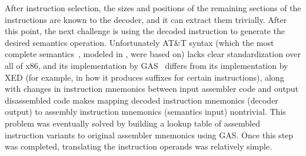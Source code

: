 After instruction selection, the sizes and positions of the remaining sections of the instructions are known to the decoder, and it can extract them trivially.  After this point, the next challenge is using the decoded instruction to generate the desired semantics operation.  Unfortunately AT\&T syntax (which the most complete \ISA semantics~\cite{Dasgupta:2019}, modeled in \K, were based on) lacks clear standardization over all of x86, and its implementation by GAS~\cite{gas} differs from its implementation by XED (for example, in how it produces suffixes for certain instructions), along with changes in instruction mnemonics between input assembler code and output disassembled code makes mapping decoded instruction mnemonics (decoder output) to assembly instruction mnemonics (semantics input) nontrivial.  This problem was eventually solved by building a lookup table of assembled instruction variants to original assembler mnemonics using GAS.  Once this step was completed, translating the instruction operands was relatively simple.

